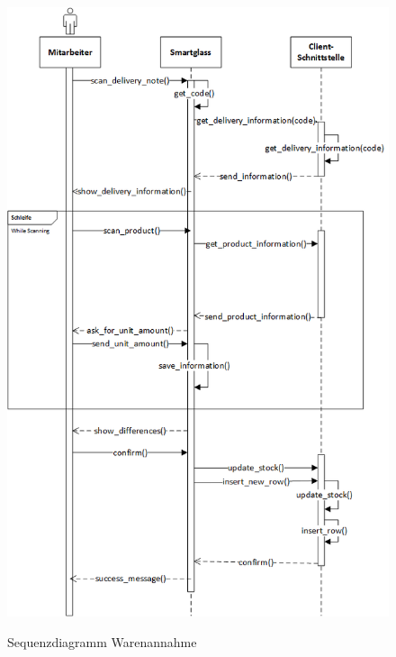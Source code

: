\begin{figure}[H]
	\centering
	{\includegraphics[scale=0.75]{Bilder/Abbildungen/SMAR_warenannahme_Sequenzdiagramm.png}}
	\caption{Sequenzdiagramm Warenannahme}
	\label{fig:sequenz_warenannnahme}
\end{figure}

